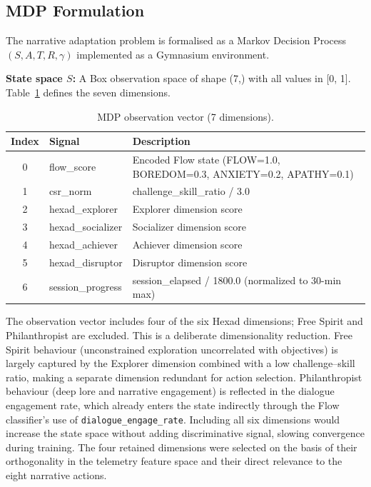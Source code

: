 \subsection{MDP Formulation}

The narrative adaptation problem is formalised as a Markov Decision Process $(S, A, T, R, \gamma)$ implemented as a Gymnasium environment.

\textbf{State space $S$:} A Box observation space of shape (7,) with all values in [0, 1]. Table~\ref{tab:mdp_state} defines the seven dimensions.

\begin{table}[H]
\centering
\caption{MDP observation vector (7 dimensions).}
\label{tab:mdp_state}
\small
\begin{tabular}{@{}clp{7cm}@{}}
\toprule
\textbf{Index} & \textbf{Signal} & \textbf{Description} \\
\midrule
0 & flow\_score & Encoded Flow state (FLOW=1.0, BOREDOM=0.3, ANXIETY=0.2, APATHY=0.1) \\
1 & csr\_norm & challenge\_skill\_ratio / 3.0 \\
2 & hexad\_explorer & Explorer dimension score \\
3 & hexad\_socializer & Socializer dimension score \\
4 & hexad\_achiever & Achiever dimension score \\
5 & hexad\_disruptor & Disruptor dimension score \\
6 & session\_progress & session\_elapsed / 1800.0 (normalized to 30-min max) \\
\bottomrule
\end{tabular}
\end{table}

The observation vector includes four of the six Hexad dimensions; Free Spirit and Philanthropist are excluded. This is a deliberate dimensionality reduction. Free Spirit behaviour (unconstrained exploration uncorrelated with objectives) is largely captured by the Explorer dimension combined with a low challenge--skill ratio, making a separate dimension redundant for action selection. Philanthropist behaviour (deep lore and narrative engagement) is reflected in the dialogue engagement rate, which already enters the state indirectly through the Flow classifier's use of \texttt{dialogue\_engage\_rate}. Including all six dimensions would increase the state space without adding discriminative signal, slowing convergence during training. The four retained dimensions were selected on the basis of their orthogonality in the telemetry feature space and their direct relevance to the eight narrative actions.

